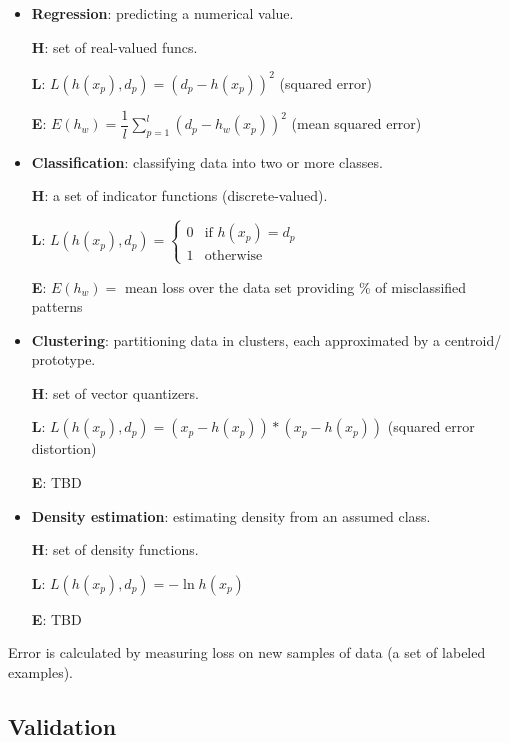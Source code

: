 \begin{itemize}
    \item \textbf{Regression}: predicting a numerical value.
    
    \textbf{H}: set of real-valued funcs.
    
    \textbf{L}: $L(h(x_p),d_p) = (d_p - h(x_p))^2$ (squared error)
    
    \textbf{E}: $E(h_w) = \dfrac{1}{l} \sum_{p=1}^l (d_p - h_w(x_p))^2$ (mean squared error)

    \item \textbf{Classification}: classifying data into two or more classes.

    \textbf{H}: a set of indicator functions (discrete-valued).
    
    \textbf{L}: $L(h(x_p),d_p) = \begin{cases}
                                    0 & \text{if } h(x_p) = d_p \\
                                    1 & \text{otherwise}
                                \end{cases}$
                                    
    \textbf{E}: $E(h_w) = $ mean loss over the data set providing \% of misclassified patterns

    \item \textbf{Clustering}: partitioning data in clusters, each approximated by a centroid/ prototype.

    \textbf{H}: set of vector quantizers.
    
    \textbf{L}: $L(h(x_p), d_p) = (x_p - h(x_p)) * (x_p - h(x_p))$ (squared error distortion)

    \textbf{E}: TBD

    \item \textbf{Density estimation}: estimating density from an assumed class.

    \textbf{H}: set of density functions.

    \textbf{L}: $L(h(x_p), d_p) = -\ln{h(x_p)}$

    \textbf{E}: TBD
\end{itemize}

Error is calculated by measuring loss on new samples of data (a set of labeled examples).

\subsection{Validation}

